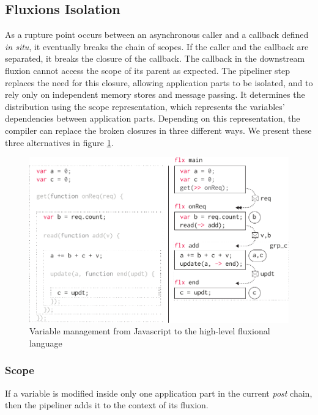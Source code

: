 \subsection{Fluxions Isolation} \label{chapter5:flx:isolation}

As a rupture point occurs between an asynchronous caller and a callback defined \textit{in situ}, it eventually breaks the chain of scopes.
If the caller and the callback are separated, it breaks the closure of the callback.
The callback in the downstream fluxion cannot access the scope of its parent as expected. %
The pipeliner step replaces the need for this closure, allowing application parts to be isolated, and to rely only on independent memory stores and message passing.
It determines the distribution using the scope representation, which represents the variables' dependencies between application parts.
Depending on this representation, the compiler can replace the broken closures in three different ways.
We present these three alternatives in figure \ref{fig:states}.

\begin{figure}[h!]
  \centering
  \includegraphics[width=0.7\linewidth]{../resources/states.pdf}
  \caption{Variable management from Javascript to the high-level fluxional language}
  \label{fig:states}
\end{figure}

\subsubsection{Scope}
If a variable is modified inside only one application part in the current \textit{post} chain, then the pipeliner adds it to the context of its fluxion.

